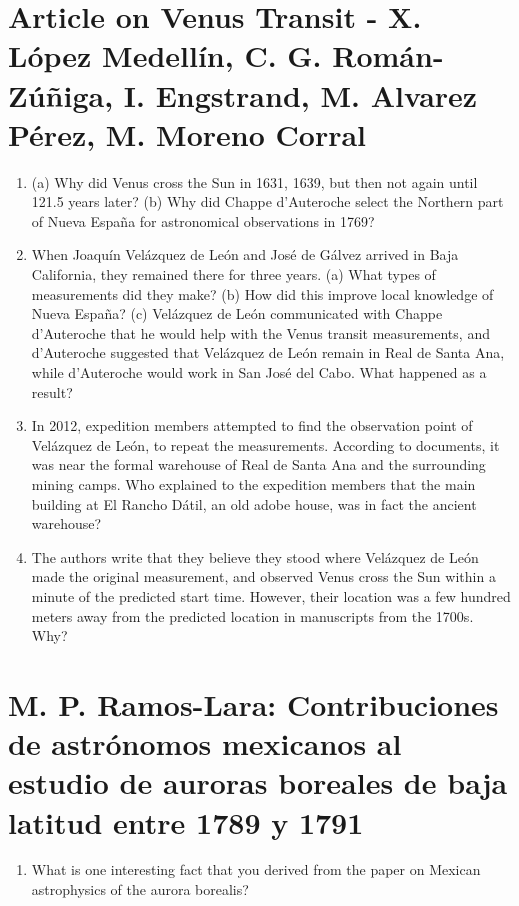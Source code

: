 \documentclass[12pt]{article}
\begin{document}
\maketitle

\small

\section{Article on Venus Transit - X. L\'{o}pez Medell\'{i}n, C. G. Rom\'{a}n-Z\'{u}\~{n}iga, I. Engstrand, M. Alvarez P\'{e}rez, M. Moreno Corral}

\begin{enumerate}
\item (a) Why did Venus cross the Sun in 1631, 1639, but then not again until 121.5 years later?  (b) Why did Chappe d'Auteroche select the Northern part of Nueva Espa\~{n}a for astronomical observations in 1769? \\ \vspace{0.5cm} 
\item When Joaqu\'{i}n Vel\'{a}zquez de Le\'{o}n and Jos\'{e} de G\'{a}lvez arrived in Baja California, they remained there for three years.  (a) What types of measurements did they make? (b) How did this improve local knowledge of Nueva Espa\~{n}a? (c) Vel\'{a}zquez de Le\'{o}n communicated with Chappe d'Auteroche that he would help with the Venus transit measurements, and d'Auteroche suggested that Vel\'{a}zquez de Le\'{o}n remain in Real de Santa Ana, while d'Auteroche would work in San Jos\'{e} del Cabo.  What happened as a result? \\ \vspace{1cm}
\item In 2012, expedition members attempted to find the observation point of Vel\'{a}zquez de Le\'{o}n, to repeat the measurements.  According to documents, it was near the formal warehouse of Real de Santa Ana and the surrounding mining camps.  Who explained to the expedition members that the main building at El Rancho D\'{a}til, an old adobe house, was in fact the ancient warehouse? \\ \vspace{1cm}
\item The authors write that they believe they stood where Vel\'{a}zquez de Le\'{o}n made the original measurement, and observed Venus cross the Sun within a minute of the predicted start time.  However, their location was a few hundred meters away from the predicted location in manuscripts from the 1700s.  Why? \\ \vspace{1cm}
\end{enumerate}

\section{M. P. Ramos-Lara: Contribuciones de astr\'{o}nomos mexicanos al estudio de auroras boreales de baja latitud entre 1789 y 1791}

\begin{enumerate}
\item What is one interesting fact that you derived from the paper on Mexican astrophysics of the aurora borealis?
\end{enumerate}
\end{document}
